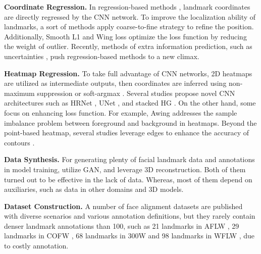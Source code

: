 \documentclass[letterpaper]{article} \usepackage{aaai23}  \usepackage{times}  \usepackage{helvet}  \usepackage{courier}  \usepackage[hyphens]{url}  \usepackage{graphicx} \urlstyle{rm} \def\UrlFont{\rm}  \usepackage{natbib}  \usepackage{caption} \frenchspacing  \setlength{\pdfpagewidth}{8.5in}  \setlength{\pdfpageheight}{11in}  \usepackage{algorithm}
\begin{document}
\vspace{5pt}
\noindent\textbf{Coordinate Regression.}
In regression-based methods \cite{sun2013deep,toshev2014deeppose,trigeorgis2016mnemonic,lv2017deep,zhou2013extensive,zhang2014coarse}, landmark coordinates are directly regressed by the CNN network. 
To improve the localization ability of landmarks, a sort of methods \cite{zhang2014coarse,trigeorgis2016mnemonic,sun2013deep} apply coarse-to-fine strategy to refine the position.
Additionally, Smooth L1 \cite{girshick2015fast} and Wing loss \cite{feng2018wing} optimize the loss function by reducing the weight of outlier. 
Recently, methods of extra information prediction, such as uncertainties \cite{kumar2020luvli,gundavarapu2019structured}, push regression-based methods to a new climax.

\vspace{5pt}
\noindent\textbf{Heatmap Regression.}
To take full advantage of CNN networks, 2D heatmaps are utilized as intermediate outputs, then coordinates are inferred using non-maximum suppression or soft-argmax \cite{bulat2016convolutional,deng2019joint,dong2018style,newell2016stacked,wei2016convolutional}.
Several studies propose novel CNN architectures such as HRNet \cite{wang2020deep}, UNet \cite{ronneberger2015u}, and stacked HG \cite{newell2016stacked}. On the other hand, some focus on enhancing loss function. For example, Awing \cite{wang2019adaptive} addresses the sample imbalance problem between foreground and background in heatmaps.
Beyond the point-based heatmap, several studies leverage edges to enhance the accuracy of contours \cite{wu2018look,huang2020propagationnet,huang2021adnet}.

\vspace{5pt}
\noindent\textbf{Data Synthesis.}
For generating plenty of facial landmark data and annotations in model training, 
\cite{robinson2019laplace,qian2019aggregation} utilize GAN, and
\cite{huang2020ace,browatzki20203fabrec} leverage 3D reconstruction.
Both of them turned out to be effective in the lack of data.
Whereas, most of them depend on auxiliaries, such as data in other domains and 3D models.

\vspace{5pt}
\noindent\textbf{Dataset Construction.}
A number of face alignment datasets are published with diverse scenarios and various annotation definitions, but they rarely contain denser landmark annotations than 100,
such as 21 landmarks in AFLW \cite{koestinger2011annotated}, 29 landmarks in COFW \cite{burgos2013robust}, 68 landmarks in 300W \cite{sagonas2013300} and 98 landmarks in WFLW \cite{wu2018look}, due to costly annotation. 
\end{document}
